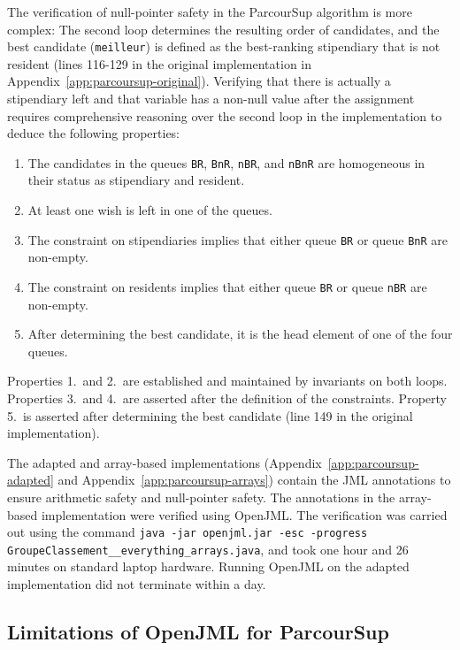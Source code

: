 \documentclass[a4paper]{report}
\newcommand{\aref}[1]{Appendix~\ref{#1}}
\begin{document}
The verification of null-pointer safety in the ParcourSup algorithm is more
complex: The second loop determines the resulting order of candidates, and the
best candidate (\texttt{meilleur}) is defined as the best-ranking stipendiary
that is not resident (lines 116-129 in the original implementation in
\aref{app:parcoursup-original}). Verifying that there is actually a stipendiary
left and that variable has a non-null value after the assignment requires
comprehensive reasoning over the second loop in the implementation to deduce the
following properties:
\begin{enumerate}
\item The candidates in the queues \texttt{BR}, \texttt{BnR}, \texttt{nBR}, and
  \texttt{nBnR} are homogeneous in their status as stipendiary and resident.
\item At least one wish is left in one of the queues.
\item The constraint on stipendiaries implies that either queue \texttt{BR} or
  queue \texttt{BnR} are non-empty.
\item The constraint on residents implies that either queue \texttt{BR} or queue
  \texttt{nBR} are non-empty.
\item After determining the best candidate, it is the head element of one of the
  four queues.
\end{enumerate}

Properties 1.\ and 2.\ are established and maintained by invariants on both
loops. Properties 3.\ and 4.\ are asserted after the definition of the
constraints. Property 5.\ is asserted after determining the best candidate (line
149 in the original implementation).

The adapted and array-based implementations (\aref{app:parcoursup-adapted} and
\aref{app:parcoursup-arrays}) contain the JML annotations to ensure arithmetic
safety and null-pointer safety. The annotations in the array-based
implementation were verified using OpenJML. The verification was carried out
using the command %
\lstinline{java -jar openjml.jar -esc -progress GroupeClassement__everything_arrays.java}, %
and took one hour and 26 minutes on standard laptop hardware. Running OpenJML on
the adapted implementation did not terminate within a day.

\subsection{Limitations of OpenJML for ParcourSup}
\end{document}
